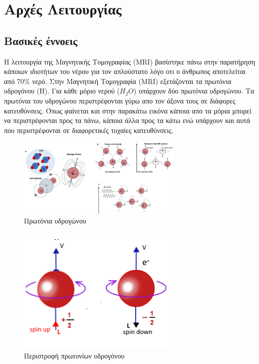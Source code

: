 \documentclass{article}
\begin{document}
\section{Αρχές Λειτουργίας}
\subsection{Βασικές έννοεις}
Η λειτουργία της Μαγνητικής Τομογραφίας (MRΙ) βασίστηκε πάνω στην παρατήρηση κάποιων ιδιοτήτων του νέρου για τον απλούστατο λόγο οτι ο άνθρωπος αποτελείται από 70\% νερό. Στην Μαγνητική Τομογραφία (MRI) εξετάζονται τα πρωτόνια υδρογόνου (H). Για κάθε μόριο νερού ($H_2 O$) υπάρχουν δύο πρωτόνια υδρογώνου. Tα πρωτόνια του υδρογώνου περιστρέφονται γύρω απο τον άξονα τους σε διάφορες κατευθύνσεις. Όπως φαίνεται και στην παρακάτω εικόνα κάποια απο τα μόρια μπορεί να περιστρέφονται προς τα πάνω, κάποια άλλα προς τα κάτω ενώ υπάρχουν και αυτά που περιστρέφονται σε διαφορετικές τυχαίες κατευθύνσεις. 
\begin{figure}[h!]	
     \centering
  \includegraphics[width=80mm,scale=2]{tasos.jpg}
  \caption{Πρωτόνια υδρογώνου}
\end{figure}
\begin{figure}[h!]	
     \centering
  \includegraphics[width=80mm,scale=2]{spin.png}
  \caption{Περιστροφή πρωτονίων υδρογόνου}
\end{figure}
\clearpage
\end{document}
